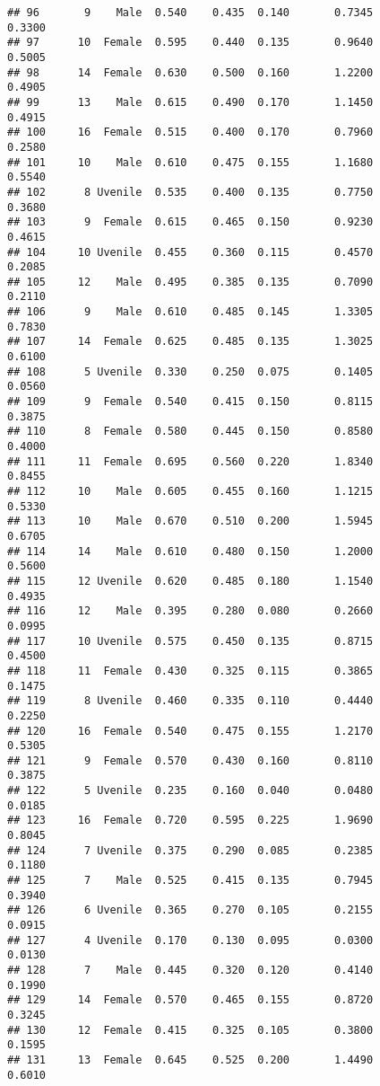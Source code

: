 \documentclass[
]{article}
\begin{document}
\begin{verbatim}
## 96       9    Male  0.540    0.435  0.140       0.7345         0.3300
## 97      10  Female  0.595    0.440  0.135       0.9640         0.5005
## 98      14  Female  0.630    0.500  0.160       1.2200         0.4905
## 99      13    Male  0.615    0.490  0.170       1.1450         0.4915
## 100     16  Female  0.515    0.400  0.170       0.7960         0.2580
## 101     10    Male  0.610    0.475  0.155       1.1680         0.5540
## 102      8 Uvenile  0.535    0.400  0.135       0.7750         0.3680
## 103      9  Female  0.615    0.465  0.150       0.9230         0.4615
## 104     10 Uvenile  0.455    0.360  0.115       0.4570         0.2085
## 105     12    Male  0.495    0.385  0.135       0.7090         0.2110
## 106      9    Male  0.610    0.485  0.145       1.3305         0.7830
## 107     14  Female  0.625    0.485  0.135       1.3025         0.6100
## 108      5 Uvenile  0.330    0.250  0.075       0.1405         0.0560
## 109      9  Female  0.540    0.415  0.150       0.8115         0.3875
## 110      8  Female  0.580    0.445  0.150       0.8580         0.4000
## 111     11  Female  0.695    0.560  0.220       1.8340         0.8455
## 112     10    Male  0.605    0.455  0.160       1.1215         0.5330
## 113     10    Male  0.670    0.510  0.200       1.5945         0.6705
## 114     14    Male  0.610    0.480  0.150       1.2000         0.5600
## 115     12 Uvenile  0.620    0.485  0.180       1.1540         0.4935
## 116     12    Male  0.395    0.280  0.080       0.2660         0.0995
## 117     10 Uvenile  0.575    0.450  0.135       0.8715         0.4500
## 118     11  Female  0.430    0.325  0.115       0.3865         0.1475
## 119      8 Uvenile  0.460    0.335  0.110       0.4440         0.2250
## 120     16  Female  0.540    0.475  0.155       1.2170         0.5305
## 121      9  Female  0.570    0.430  0.160       0.8110         0.3875
## 122      5 Uvenile  0.235    0.160  0.040       0.0480         0.0185
## 123     16  Female  0.720    0.595  0.225       1.9690         0.8045
## 124      7 Uvenile  0.375    0.290  0.085       0.2385         0.1180
## 125      7    Male  0.525    0.415  0.135       0.7945         0.3940
## 126      6 Uvenile  0.365    0.270  0.105       0.2155         0.0915
## 127      4 Uvenile  0.170    0.130  0.095       0.0300         0.0130
## 128      7    Male  0.445    0.320  0.120       0.4140         0.1990
## 129     14  Female  0.570    0.465  0.155       0.8720         0.3245
## 130     12  Female  0.415    0.325  0.105       0.3800         0.1595
## 131     13  Female  0.645    0.525  0.200       1.4490         0.6010

\end{verbatim}
\end{document}
